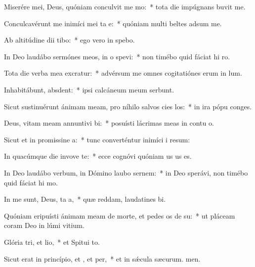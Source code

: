 \item Miserére mei, Deus, quóniam conculvit me mo:~* tota die impúgnans buvit me.
\item Conculcavérunt me inimíci mei ta e:~* quóniam multi beltes adsum me.
\item Ab altitúdine dii tibo:~* ego vero in  spebo.
\item In Deo laudábo sermónes meos, in o spevi:~* non timébo quid fáciat hi ro.
\item Tota die verba mea excratur:~* advérsum me omnes cogitatiónes erum in lum.
\item Inhabitábunt,  absdent:~* ipsi calcáneum meum serbunt.
\item Sicut sustinuérunt ánimam meam, pro níhilo salvos cies los:~* in ira pópu conges.
\item Deus, vitam meam annuntivi bi:~* posuísti lácrimas meas in contu o.
\item Sicut et in promissine a:~* tunc converténtur inimíci i resum:
\item In quacúmque die invove te:~* ecce cognóvi quóniam us us es.
\item In Deo laudábo verbum, in Dómino laubo sernem:~* in Deo sperávi, non timébo quid fáciat hi mo.
\item In me sunt, Deus, ta a,~* quæ reddam, laudatines bi.
\item Quóniam eripuísti ánimam meam de morte, et pedes os de su:~* ut pláceam coram Deo in lúmi vitium.
\item Glória tri, et lio,~* et Spitui to.
\item Sicut erat in princípio, et , et per,~* et in sǽcula sæcurum. men.

